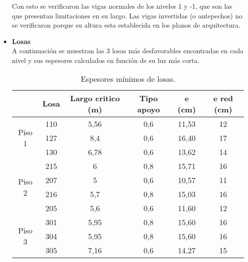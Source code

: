 \documentclass[letterpaper,11pt]{article} %
\begin{document}
\begin{itemize}
        Con esto se verificaron las vigas normales de los niveles 1 y -1, que son las que presentan limitaciones en su largo. 
        Las vigas invertidas (o antepechos) no se verificaron porque su altura esta establecida en los planos de arquitectura.
\newpage
        \item \textbf{Losas}\\
        A continuación se muestran las 3 losas más desfavorables encontradas en cada nivel y sus espesores calculados en función de su luz más corta.
        
    \begin{table}[H]
      \centering
      \caption{Espesores mínimos de losas.}
        \begin{tabular}{|c|ccccc|}
    \cline{2-6}    \multicolumn{1}{r|}{} &
          \textbf{Losa} &
          \textbf{Largo critico (m)} &
          \textbf{Tipo apoyo} &
          \textbf{e (cm)} &
          \textbf{e red (cm)}
          \bigstrut\\
        \hline
        \multirow{3}[2]{*}{Piso 1} &
          110 &
          5,56 &
          0,6 &
          11,53 &
          12
          \bigstrut[t]\\
         &
          127 &
          8,4 &
          0,6 &
          16,40 &
          17
          \\
         &
          130 &
          6,78 &
          0,6 &
          13,62 &
          14
          \bigstrut[b]\\
        \hline
        \multirow{4}[2]{*}{Piso 2} &
          215 &
          6 &
          0,8 &
          15,71 &
          16
          \bigstrut[t]\\
         &
          207 &
          5 &
          0,6 &
          10,57 &
          11
          \\
         &
          216 &
          5,7 &
          0,8 &
          15,03 &
          16
          \\
         &
          205 &
          5,6 &
          0,6 &
          11,60 &
          12
          \bigstrut[b]\\
        \hline
        \multirow{3}[2]{*}{Piso 3} &
          301 &
          5,95 &
          0,8 &
          15,60 &
          16
          \bigstrut[t]\\
         &
          304 &
          5,95 &
          0,8 &
          15,60 &
          16
          \\
         &
          305 &
          7,16 &
          0,6 &
          14,27 &
          15
          \bigstrut[b]\\

\end{tabular}
\end{table}
\end{itemize}
\end{document}
